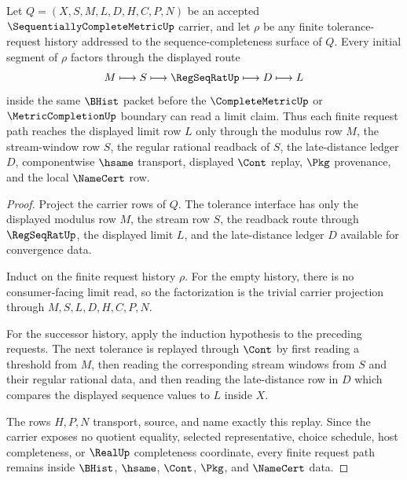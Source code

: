 \begin{theorem}
\label{thm:sequentially-complete-metric-limit-modulus-induction}
Let $Q=(X,S,M,L,D,H,C,P,N)$ be an accepted $\SequentiallyCompleteMetricUp$ carrier, and let $\rho$ be any finite tolerance-request history addressed to the sequence-completeness surface of $Q$. Every initial segment of $\rho$ factors through the displayed route
$$
M\longmapsto S\longmapsto \RegSeqRatUp\longmapsto D\longmapsto L
$$
inside the same $\BHist$ packet before the $\CompleteMetricUp$ or $\MetricCompletionUp$ boundary can read a limit claim. Thus each finite request path reaches the displayed limit row $L$ only through the modulus row $M$, the stream-window row $S$, the regular rational readback of $S$, the late-distance ledger $D$, componentwise $\hsame$ transport, displayed $\Cont$ replay, $\Pkg$ provenance, and the local $\NameCert$ row.
\end{theorem}
\begin{proof}
Project the carrier rows of $Q$. The tolerance interface has only the displayed modulus row $M$, the stream row $S$, the readback route through $\RegSeqRatUp$, the displayed limit $L$, and the late-distance ledger $D$ available for convergence data.

Induct on the finite request history $\rho$. For the empty history, there is no consumer-facing limit read, so the factorization is the trivial carrier projection through $M,S,L,D,H,C,P,N$.

For the successor history, apply the induction hypothesis to the preceding requests. The next tolerance is replayed through $\Cont$ by first reading a threshold from $M$, then reading the corresponding stream windows from $S$ and their regular rational data, and then reading the late-distance row in $D$ which compares the displayed sequence values to $L$ inside $X$.

The rows $H,P,N$ transport, source, and name exactly this replay. Since the carrier exposes no quotient equality, selected representative, choice schedule, host completeness, or $\RealUp$ completeness coordinate, every finite request path remains inside $\BHist$, $\hsame$, $\Cont$, $\Pkg$, and $\NameCert$ data.
\end{proof}

